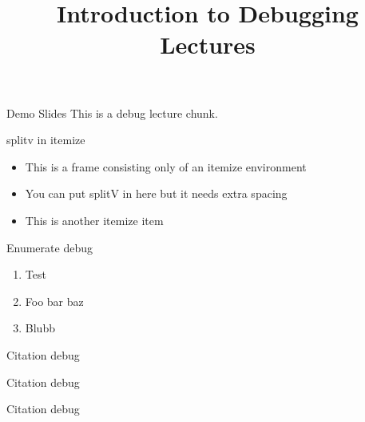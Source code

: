 \documentclass[11pt,compress,t,notes=noshow, xcolor=table]{beamer}
\title{Introduction to Debugging Lectures}
\begin{document}

\begin{frame}{Demo Slides}
  \vfill
  This is a debug lecture chunk.
  \vfill
\end{frame}


\begin{frame}{splitv in itemize}
  \begin{itemize}
    \item This is a frame consisting only of an itemize environment
    \item You can put splitV in here but it needs extra spacing
    \vfill
    \vfill
    \item This is another itemize item
  \end{itemize}
\end{frame}

\begin{frame}{Enumerate debug}
  \begin{enumerate}
    \item Test
    \item Foo bar baz
    \item Blubb
  \end{enumerate}
\end{frame}


\begin{frame}{Citation debug}
  \vfill
\end{frame}

\begin{frame}{Citation debug}
\end{frame}

\begin{frame}{Citation debug}
\end{frame}
\end{document}
